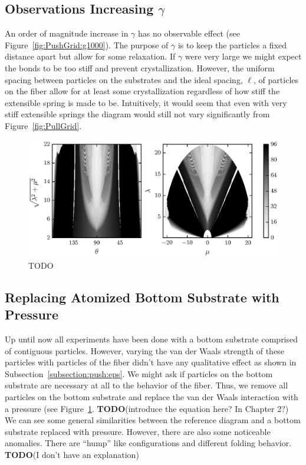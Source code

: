 \subsection{Observations Increasing $\gamma$}

An order of magnitude increase in $\gamma$ has no observable effect (see Figure~\ref{fig:PushGrid:g1000}). The purpose of $\gamma$ is to keep the particles a fixed distance apart but allow for some relaxation. If $\gamma$ were very large we might expect the bonds to be too stiff and prevent crystallization. However, the uniform spacing between particles on the substrates and the ideal spacing, $\ell$, of particles on the fiber allow for at least some crystallization regardless of how stiff the extensible spring is made to be. Intuitively, it would seem that even with very stiff extensible springs the diagram would still not vary significantly from Figure~\ref{fig:PullGrid}.

	\begin{figure}[t]
		\begin{center}
			\includegraphics{./fig/ch3/push/p1/grid.eps}
		\end{center}		
		\caption{ TODO
		\label{fig:PushGrid:p1}}
	\end{figure}

\subsection{Replacing Atomized Bottom Substrate with Pressure}

Up until now all experiments have been done with a bottom substrate comprised of contiguous particles. However, varying the van der Waals strength of these particles with particles of the fiber didn't have any qualitative effect as shown in Subsection~\ref{subsection:push:eps}. We might ask if particles on the bottom substrate are necessary at all to the behavior of the fiber. Thus, we remove all particles on the bottom substrate and replace the van der Waals interaction with a pressure (see Figure~\ref{fig:PushGrid:p1}. \textbf{TODO}(introduce the equation here? In Chapter 2?) We can see some general similarities between the reference diagram and a bottom substrate replaced with pressure. However, there are also some noticeable anomalies. There are ``hump'' like configurations and different folding behavior. \textbf{TODO}(I don't have an explanation)

